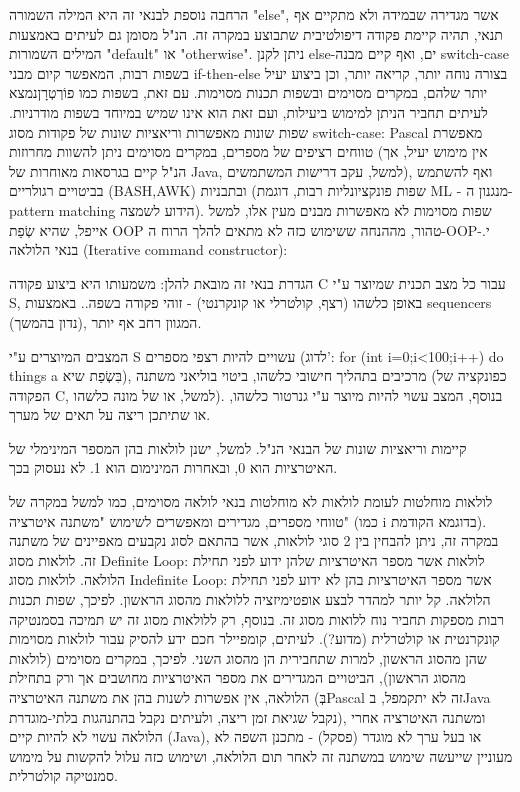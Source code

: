 \begin{טבלא}[!htbp]
        הרחבה נוספת לבנאי זה היא המילה השמורה "else", אשר מגדירה שבמידה ולא מתקיים אף
        תנאי, תהיה קיימת פקודה דיפולטיבית שתבוצע במקרה זה. הנ"ל מסומן גם לעיתים באמצעות
        המילים השמורות "default" או "otherwise". ניתן לקנן else-ים, ואף קיים מבנה
        switch-case בשפות רבות, המאפשר קיום מבני if-then-else בצורה נוחה יותר, קריאה
        יותר, וכן ביצוע יעיל יותר שלהם, במקרים מסוימים ובשפות תכנות מסוימות. עם זאת,
        בשפות כמו פוֹרְטְרָןנמצא לעיתים תחביר הניתן למימוש ביעילות, ועם זאת הוא אינו שמיש
        במיוחד בשפות מודרניות. שפות שונות מאפשרות וריאציות שונות של פקודות מסוג
        switch-case: Pascal מאפשרת טווחים רציפים של מספרים, במקרים מסוימים ניתן להשוות
        מחרוזות (אין מימוש יעיל, אך הנ"ל קיים בגרסאות מאוחרות של Java, למשל, עקב דרישות
        המשתמשים), ואף להשתמש בביטויים רגולריים (BASH,AWK) ובתבניות (שפות פונקציונליות
        רבות, דוגמת ML - מנגנון ה- pattern matching הידוע לשמצה). שפות מסוימות לא
        מאפשרות מבנים מעין אלו, למשל אייפל, שהיא שְׂפַת OOP טהור, מההנחה ששימוש כזה לא
        מתאים להלך הרוח ה-OOP-י.
        בנאי הלולאה (Iterative command constructor):

        הגדרת בנאי זה מובאת להלן:
        משמעותו היא ביצוע פקודה C עבור כל מצב תכנית שמיוצר ע"י S, באופן כלשהו (רצף,
        קולטרלי או קונקרנטי) - זוהי פקודה בשפה.. באמצעות sequencers (נדון בהמשך),
        המגוון רחב אף יותר.

        המצבים המיוצרים ע"י S עשויים להיות רצפי מספרים (לדוג': for (int i=0;i<100;i++)
        {do things} a בִּשְׂפַת שיא), מרכיבים בתהליך חישובי כלשהו, ביטוי בוליאני משתנה
        (כפונקציה של הפקודה C, למשל, או של מונה כלשהו). בנוסף, המצב עשוי להיות מיוצר
        ע"י גנרטור כלשהו, או שתיתכן ריצה על תאים של מערך.

        קיימות וריאציות שונות של הבנאי הנ"ל. למשל, ישנן לולאות בהן המספר המינימלי של
        האיטרציות הוא 0, ובאחרות המינימום הוא 1. לא נעסוק בכך.

        לולאות מוחלטות לעומת לולאות לא מוחלטות
        בנאי לולאה מסוימים, כמו למשל במקרה של טווחי מספרים, מגדירים ומאפשרים לשימוש
        "משתנה איטרציה" (כמו i בדוגמא הקודמת). במקרה זה, ניתן להבחין בין 2 סוגי לולאות,
        אשר בהתאם לסוג נקבעים מאפיינים של משתנה זה. לולאות מסוג Definite Loop: לולאות
        אשר מספר האיטרציות שלהן ידוע לפני תחילת הלולאה.
        לולאות מסוג Indefinite Loop: אשר מספר האיטרציות בהן לא ידוע לפני תחילת הלולאה.
        קל יותר למהדר לבצע אופטימיזציה ללולאות מהסוג הראשון. לפיכך, שפות תכנות רבות מספקות תחביר נוח ללואות מסוג זה. בנוסף, רק ללולאות מסוג זה יש תמיכה בסמנטיקה קונקרנטית או קולטרלית (מדוע?). לעיתים, קומפיילר חכם ידע להסיק עבור לולאות מסוימות שהן מהסוג הראשון, למרות שתחבירית הן מהסוג השני.
        לפיכך, במקרים מסוימים (לולאות מהסוג הראשון), הביטויים המגדירים את מספר האיטרציות מחושבים אך ורק בתחילת הלולאה, אין אפשרות לשנות בהן את משתנה האיטרציה (בְּPascal זה לא יתקמפל, בJava נקבל שגיאת זמן ריצה, ולעיתים נקבל בהתנהגות בלתי-מוגדרת), ומשתנה האיטרציה אחרי הלולאה עשוי לא להיות קיים (Java), או בעל ערך לא מוגדר (פסקל) - מתכנן השפה לא מעוניין שייעשה שימוש במשתנה זה לאחר תום הלולאה, ושימוש כזה עלול להקשות על מימוש סמנטיקה קולטרלית.


\end{טבלא}
